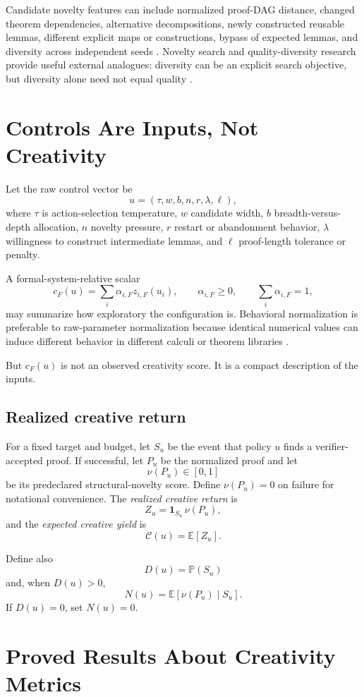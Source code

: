 \documentclass[11pt]{article}
\theoremstyle{datatheorem}
\theoremstyle{definition}
\newcommand{\E}{\mathbb{E}}
\newcommand{\Prb}{\mathbb{P}}
\newcommand{\ind}{\mathbf{1}}
\newcommand{\cY}{\mathcal{C}}
\begin{document}
Candidate novelty features can include normalized proof-DAG distance, changed theorem dependencies, alternative decompositions, newly constructed reusable lemmas, different explicit maps or constructions, bypass of expected lemmas, and diversity across independent seeds \cite{tennesonC1,tennesonCombined}. Novelty search and quality-diversity research provide useful external analogues: diversity can be an explicit search objective, but diversity alone need not equal quality \cite{lehman2011,pugh2016,mouret2015}.

\section{Controls Are Inputs, Not Creativity}

Let the raw control vector be
\[
u=(\tau,w,b,n,r,\lambda,\ell),
\]
where $\tau$ is action-selection temperature, $w$ candidate width, $b$ breadth-versus-depth allocation, $n$ novelty pressure, $r$ restart or abandonment behavior, $\lambda$ willingness to construct intermediate lemmas, and $\ell$ proof-length tolerance or penalty.

A formal-system-relative scalar
\[
c_F(u)=\sum_i \alpha_{i,F}z_{i,F}(u_i),
\qquad
\alpha_{i,F}\ge 0,
\qquad
\sum_i\alpha_{i,F}=1,
\]
may summarize how exploratory the configuration is. Behavioral normalization is preferable to raw-parameter normalization because identical numerical values can induce different behavior in different calculi or theorem libraries \cite{tennesonC2}.

But $c_F(u)$ is not an observed creativity score. It is a compact description of the inputs.

\subsection{Realized creative return}

For a fixed target and budget, let $S_u$ be the event that policy $u$ finds a verifier-accepted proof. If successful, let $P_u$ be the normalized proof and let
\[
\nu(P_u)\in[0,1]
\]
be its predeclared structural-novelty score. Define $\nu(P_u)=0$ on failure for notational convenience. The \emph{realized creative return} is
\[
Z_u=\ind_{S_u}\,\nu(P_u),
\]
and the \emph{expected creative yield} is
\[
\cY(u)=\E[Z_u].
\]

Define also
\[
D(u)=\Prb(S_u)
\]
and, when $D(u)>0$,
\[
N(u)=\E[\nu(P_u)\mid S_u].
\]
If $D(u)=0$, set $N(u)=0$.

\section{Proved Results About Creativity Metrics}
\end{document}
